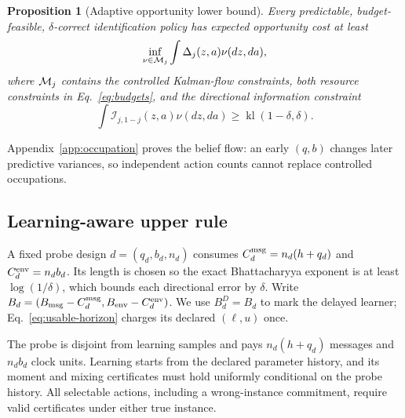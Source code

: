 \documentclass[journal]{IEEEtran}
\newtheorem{proposition}{Proposition}
\begin{document}
\begin{proposition}[Adaptive opportunity lower bound]
Every predictable, budget-feasible, $\delta$-correct identification policy has expected opportunity cost at least
\begin{equation}
\inf_{\nu\in{\cal M}_j}
\int\Delta_j(z,a)\nu(dz,da),
\label{eq:occupation-lower-bound}
\end{equation}
where ${\cal M}_j$ contains the controlled Kalman-flow constraints, both resource constraints in Eq.~\eqref{eq:budgets}, and the directional information constraint
\begin{equation}
\int\mathcal I_{j,1-j}(z,a)\nu(dz,da)
\ge\operatorname{kl}(1-\delta,\delta).
\label{eq:occupation-information}
\end{equation}
\label{prop:occupation}
\end{proposition}

Appendix~\ref{app:occupation} proves the belief flow: an early $(q,b)$ changes later predictive variances, so independent action counts cannot replace controlled occupations.

\subsection{Learning-aware upper rule}
A fixed probe design $d=(q_d,b_d,n_d)$ consumes $C_d^{\rm msg}=n_d(h+q_d)$ and $C_d^{\rm env}=n_db_d$.
Its length is chosen so the exact Bhattacharyya exponent is at least $\log(1/\delta)$, which bounds each directional error by $\delta$.
Write $B_d=(B_{\rm msg}-C_d^{\rm msg},B_{\rm env}-C_d^{\rm env})$.
We use $B_d^D=B_d$ to mark the delayed learner; Eq.~\eqref{eq:usable-horizon} charges its declared $(\ell,u)$ once.

The probe is disjoint from learning samples and pays $n_d(h+q_d)$ messages and $n_db_d$ clock units.
Learning starts from the declared parameter history, and its moment and mixing certificates must hold uniformly conditional on the probe history.
All selectable actions, including a wrong-instance commitment, require valid certificates under either true instance.
\end{document}
